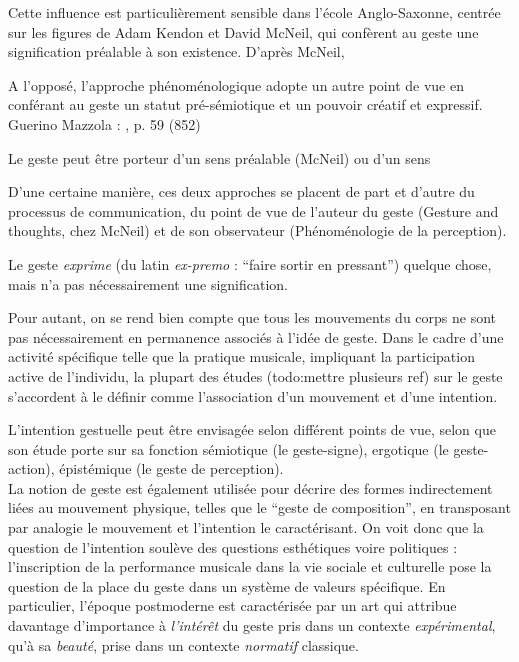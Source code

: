 Cette influence est particulièrement sensible dans l'école Anglo-Saxonne, centrée sur les figures de Adam Kendon et David McNeil, qui confèrent au geste une signification préalable à son existence. D'après McNeil, 

A l'opposé, l'approche phénoménologique adopte un autre point de vue en conférant au geste un statut pré-sémiotique et un pouvoir créatif et expressif.
Guerino Mazzola :  \cite{mazzola_topos_2018}, p. 59 (852)

Le geste peut être porteur d'un sens préalable (McNeil) ou d'un sens 

D'une certaine manière, ces deux approches se placent de part et d'autre du processus de communication, du point de vue de l'auteur du geste (Gesture and thoughts, chez McNeil) et de son observateur (Phénoménologie de la perception).

Le geste \textit{exprime} (du latin \textit{ex-premo} : ``faire sortir en pressant'') quelque chose, mais n'a pas nécessairement une signification.


Pour autant, on se rend bien compte que tous les mouvements du corps ne sont pas nécessairement en permanence associés à l'idée de geste. Dans le cadre d'une activité spécifique telle que la pratique musicale, impliquant la participation active de l'individu, la plupart des études (todo:mettre plusieurs ref) sur le geste s'accordent à le définir comme l'association d'un mouvement et d'une intention.

 \cite{imberty_mouvement_2013}

\noindent L'intention gestuelle peut être envisagée selon différent points de vue, selon que son étude porte sur sa fonction sémiotique (le geste-signe), ergotique (le geste-action), épistémique (le geste de perception).\\
\indent La notion de geste est également utilisée pour décrire des formes indirectement liées au mouvement physique, telles que le ``geste de composition'', en transposant par analogie le mouvement et l'intention le caractérisant. On voit donc que la question de l'intention soulève des questions esthétiques voire politiques : l'inscription de la performance musicale dans la vie sociale et culturelle pose la question de la place du geste dans un système de valeurs spécifique. En particulier, l'époque postmoderne est caractérisée par un art qui attribue davantage d'importance à \textit{l'intérêt} du geste pris dans un contexte \textit{expérimental}, qu'à sa \textit{beauté}, prise dans un contexte \textit{normatif} classique.

